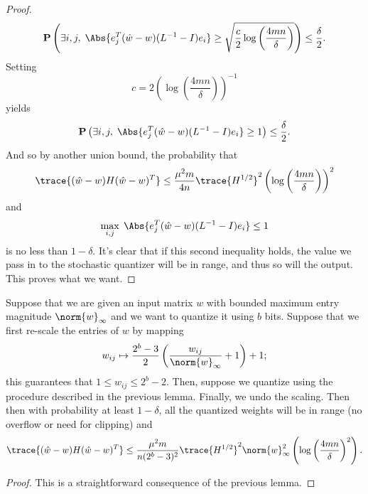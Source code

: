 \begin{toappendix}
\begin{proof}
\[
	\mathbf{P}\left( \exists i,j, \; \Abs{ e_j^T (\hat w - w) (L^{-1} - I) e_i } \ge \sqrt{\frac{c}{2} \log\left( \frac{4 m n}{\delta} \right) } \right) \le \frac{\delta}{2}.
\]
Setting
\[
	c = 2 \left( \log\left( \frac{4 m n}{\delta} \right) \right)^{-1}
\]
yields
\[
	\mathbf{P}\left( \exists i,j, \; \Abs{ e_j^T (\hat w - w) (L^{-1} - I) e_i } \ge 1 \right) \le \frac{\delta}{2}.
\]
And so by another union bound, the probability that
\[
	\trace{ (\hat w - w) H (\hat w - w)^T } \le \frac{\mu^2 m}{4n} \trace{H^{1/2}}^2 \left( \log\left( \frac{4 mn}{\delta}\right) \right)^2
\]
and
\[
	\max_{i,j} \; \Abs{ e_j^T (\hat w - w) (L^{-1} - I) e_i } \le 1
\]
is no less than $1 - \delta$. It's clear that if this second inequality holds, the value we pass in to the stochastic quantizer will be in range, and thus so will the output. This proves what we want.
\end{proof}

\begin{theorem}
Suppose that we are given an input matrix $w$ with bounded maximum entry magnitude $\norm{w}_{\infty}$ and we want to quantize it using $b$ bits. Suppose that we first re-scale the entries of $w$ by mapping
\[
	w_{ij} \mapsto \frac{2^b - 3}{2} \left( \frac{w_{ij}}{\norm{w}_{\infty}} + 1 \right) + 1;
\]
this guarantees that $1 \le w_{ij} \le 2^b - 2$. Then, suppose we quantize using the procedure described in the previous lemma. Finally, we undo the scaling. Then then with probability at least $1 - \delta$, all the quantized weights will be in range (no overflow or need for clipping) and
\[
	\trace{ (\hat w - w) H (\hat w - w)^T } \le \frac{\mu^2 m}{n (2^b - 3)^2} \trace{H^{1/2}}^2 \norm{w}_{\infty}^2 \left( \log\left( \frac{4 mn}{\delta}\right)^2 \right).
\]
\end{theorem}
\begin{proof}
This is a straightforward consequence of the previous lemma.
\end{proof}


\end{toappendix}

